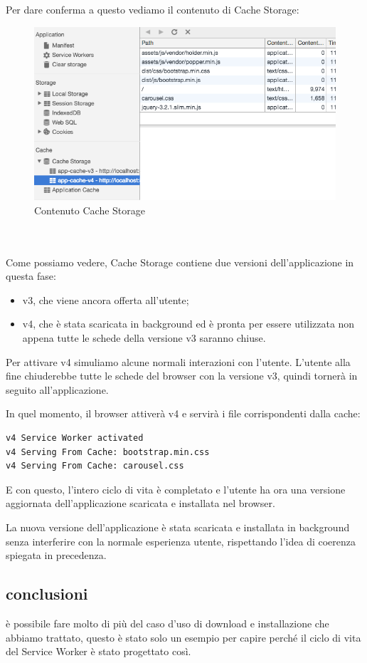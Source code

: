 \documentclass[italian]{article}
\begin{document}
Per dare conferma a questo vediamo il contenuto di Cache Storage:
\begin{figure}[h]
	\centering
	\includegraphics[width=1\linewidth]{v42}
	\caption{Contenuto Cache Storage}
	\label{fig:Contenuto Cache Storage}
\end{figure}\\
\pagebreak
\\
Come possiamo vedere, Cache Storage contiene due versioni dell'applicazione in questa fase:
\begin{itemize}
\item v3, che viene ancora offerta all'utente;
\item v4, che è stata scaricata in background ed è pronta per essere utilizzata non appena tutte le schede della versione v3 saranno chiuse.
\end{itemize}
Per attivare v4 simuliamo alcune normali interazioni con l'utente. L'utente alla fine chiuderebbe tutte le schede del browser con la versione v3, quindi tornerà in seguito all'applicazione.

In quel momento, il browser attiverà v4 e servirà i file corrispondenti dalla cache:
\begin{lstlisting}
v4 Service Worker activated
v4 Serving From Cache: bootstrap.min.css
v4 Serving From Cache: carousel.css
\end{lstlisting}
E con questo, l'intero ciclo di vita è completato e l'utente ha ora una versione aggiornata dell'applicazione scaricata e installata nel browser.

La nuova versione dell'applicazione è stata scaricata e installata in background senza interferire con la normale esperienza utente, rispettando l'idea di coerenza spiegata in precedenza.

\subsection{conclusioni}
è possibile fare molto di più del caso d'uso di download e installazione che abbiamo trattato, questo è stato solo un esempio per capire perché il ciclo di vita del Service Worker è stato progettato così.
\end{document}
